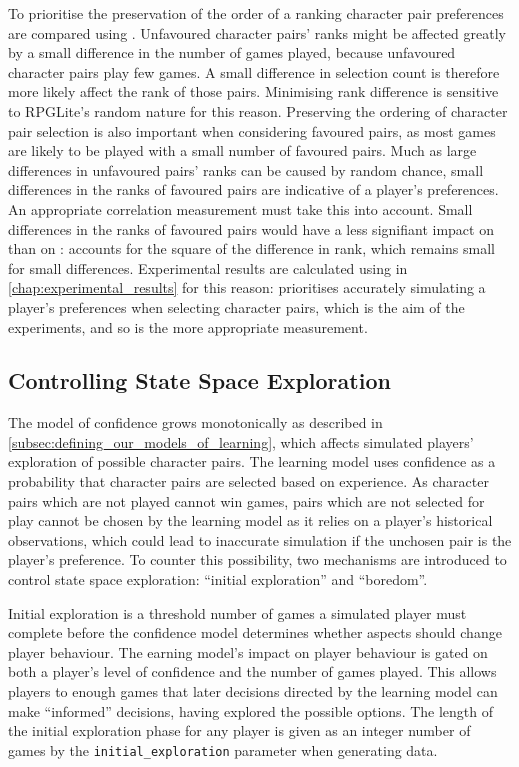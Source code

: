 To prioritise the preservation of the order of a ranking character pair
preferences are compared using \tau{}. Unfavoured character pairs' ranks might
be affected greatly by a small difference in the number of games played, because
unfavoured character pairs play few games. A small difference in selection count
is therefore more likely affect the rank of those pairs. Minimising rank
difference is sensitive to RPGLite's random nature for this reason. Preserving
the ordering of character pair selection is also important when considering
favoured pairs, as most games are likely to be played with a small number of
favoured pairs. Much as large differences in unfavoured pairs' ranks can be
caused by random chance, small differences in the ranks of favoured pairs are
indicative of a player's preferences. An appropriate correlation measurement
must take this into account. Small differences in the ranks of favoured pairs
would have a less signifiant impact on \rho{} than on \tau{}: \rho{} accounts
for the square of the difference in rank, which remains small for small
differences. Experimental results are calculated using \tau{} in
\cref{chap:experimental_results} for this reason: \tau{} prioritises accurately
simulating a player's preferences when selecting character pairs, which is the
aim of the experiments, and so is the more appropriate measurement.


\subsection{Controlling State Space Exploration}
\label{subsec:controlling_state_space_exploration}

The model of confidence grows monotonically as described in
\cref{subsec:defining_our_models_of_learning}, which affects simulated players'
exploration of possible character pairs. The learning model uses confidence as a
probability that character pairs are selected based on experience. As character
pairs which are not played cannot win games, pairs which are not selected for
play cannot be chosen by the learning model as it relies on a player's
historical observations, which could lead to inaccurate simulation if the
unchosen pair is the player's preference. To counter this possibility, two
mechanisms are introduced to control state space exploration: ``initial
exploration'' and ``boredom''.

Initial exploration is a threshold number of games a simulated player must
complete before the confidence model determines whether aspects should change
player behaviour. The earning model's impact on player behaviour is gated on
both a player's level of confidence and the number of games played. This allows
players to enough games that later decisions directed by the learning model can
make ``informed'' decisions, having explored the possible options. The length of
the initial exploration phase for any player is given as an integer number of
games by the \lstinline{initial_exploration} parameter when generating data.

